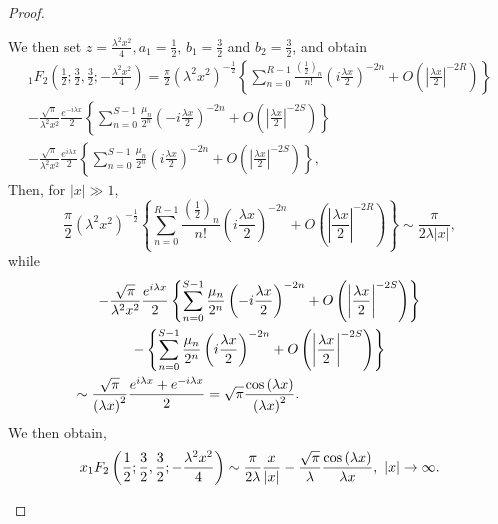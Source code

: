 \documentclass[smallextended]{svjour3}
\begin{document}
\begin{proof}
\begin{enumerate}
We then set $z=\frac{\lambda^2 x^2}{4}, a_1=\frac{1}{2}$, $b_1=\frac{3}{2}$ and $b_2=\frac{3}{2}$, and obtain
\begin{eqnarray}
{}_1F_2\left(\frac{1}{2};\frac{3}{2},\frac{3}{2};-\frac{\lambda^2 x^2}{4}\right)=\frac{\pi}{2}\left(\lambda^2 x^2\right)^{-
\frac{1}{2}}\left\{\sum\limits_{n=0}^{R-1}\frac{\left(\frac{1}{2}\right)_n }{n!}\left(i\frac{\lambda x}{2}\right)^{-2n}+O\left(\left|\frac{\lambda x}{2}\right|^{-2R}\right)\right\}\nonumber\\
-\frac{\sqrt{\pi}}{\lambda^2 x^2}\frac{e^{ -i{\lambda x}}}{2}\left\{\sum\limits_{n=0}^{S-1}\frac{\mu_n}{2^n}\left(-i\frac{\lambda x}{2}\right)^{-2n}+O\left(\left|\frac{\lambda x}{2}\right|^{-2S}\right)\right\}
\nonumber\\-\frac{\sqrt{\pi}}{\lambda^2 x^2}\frac{e^{ i{\lambda x}}}{2}\left\{\sum\limits_{n=0}^{S-1}\frac{\mu_n}{2^n}\left(i\frac{\lambda x}{2}\right)^{-2n}+O\left(\left|\frac{\lambda x}{2}\right|^{-2S}\right)\right\},
\label{asy1-2-1}
\end{eqnarray}
Then, for $|x|\gg1$,
\begin{equation}
\frac{\pi}{2}\left(\lambda^2 x^2\right)^{-
\frac{1}{2}}\left\{\sum\limits_{n=0}^{R-1}\frac{\left(\frac{1}{2}\right)_n }{n!}\left(i\frac{\lambda x}{2}\right)^{-2n}+O\left(\left|\frac{\lambda x}{2}\right|^{-2R}\right)\right\}\sim \frac{\pi}{2\lambda |x|},
\label{asy1-2-2}
\end{equation}
while
\begin{multline}
-\frac{\sqrt{\pi}}{\lambda^2 x^2}\frac{e^{ i{\lambda x}}}{2}\left\{\sum\limits_{n=0}^{S-1}\frac{\mu_n}{2^n}\left(-i\frac{\lambda x}{2}\right)^{-2n}+O\left(\left|\frac{\lambda x}{2}\right|^{-2S}\right)\right\}
\nonumber\\-\left\{\sum\limits_{n=0}^{S-1}\frac{\mu_n}{2^n}\left(i\frac{\lambda x}{2}\right)^{-2n}+O\left(\left|\frac{\lambda x}{2}\right|^{-2S}\right)\right\}\nonumber\\%
\sim \frac{\sqrt{\pi}}{\left({\lambda x}\right)^2}\frac{e^{i{\lambda x}}+e^{ -i{\lambda x}}}{2}=
{\sqrt{\pi}}\frac{\cos{\left({\lambda x}\right)}}{\left({\lambda x}\right)^2}.\hspace{3.6cm}
\label{asy1-2-3}
\end{multline}
We then obtain,
\begin{equation}
x{}_1F_2\left(\frac{1}{2};\frac{3}{2},\frac{3}{2};-\frac{\lambda^2 x^2}{4}\right)\sim\frac{\pi}{2\lambda}\frac{x}{|x|}-\frac{\sqrt{\pi}}{\lambda}\frac{\cos{\left({\lambda x}\right)}}{\lambda x}, \hspace{.12cm} |x|\rightarrow\infty.

\end{equation}
\end{enumerate}
\end{proof}
\end{document}
